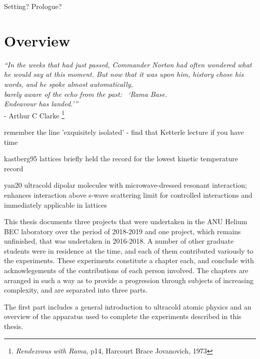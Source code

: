 

	Setting? Prologue?
\chapter{Overview}
\begin{adjustwidth}{3cm}{0cm}
\begin{flushright}
{\emph{``In the weeks that had just passed, Commander Norton had often wondered what he would say at this moment.
	But now that it was upon him, history chose his words, and he spoke almost automatically, \\barely aware of the echo from the past: ~`Rama Base.\\ \emph{Endeavour} has landed.'''\\} 
- Arthur C Clarke \footnote{\emph{Rendezvous with Rama}, p14, Harcourt Brace Jovanovich, 1973}}
\end{flushright}
\end{adjustwidth}


remember the line 'exquisitely isolated' - find that Ketterle lecture if you have time

kastberg95
		lattices briefly held the record for the lowest kinetic temperature record

yan20 ultracold dipolar molecules with microwave-dressed resonant interaction; enhances interaction above s-wave scattering limit for controlled interactions and immediately applicable in lattices

This thesis documents three projects that were undertaken in the ANU
Helium BEC laboratory over the period of 2018-2019 and one project,
which remains unfinished, that was undertaken in 2016-2018.
	A number of
other graduate students were in residence at the time, and each of them
contributed variously to the experiments.
	These experiments constitute a
chapter each, and conclude with acknowlegements of the contributions of
each person involved.
	The chapters are arranged in such a way as to
provide a progression through subjects of increasing complexity, and are
separated into three parts.

The first part includes a general introduction to ultracold atomic
physics and an overview of the apparatus used to complete the
experiments described in this thesis.

